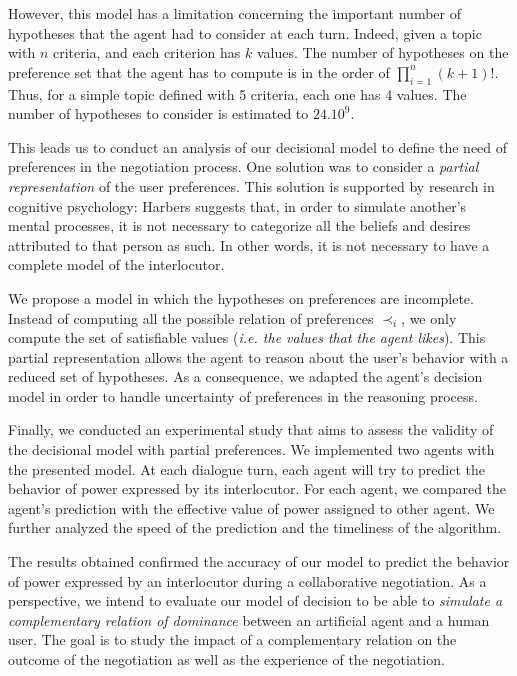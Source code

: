 \documentclass[sigconf]{aamas}  %
\begin{document}
		However, this model has a limitation concerning the important number of hypotheses that the agent had to consider at each turn. Indeed, given a topic with $n$ criteria, and each criterion has $k$ values. The number of hypotheses on the preference set that the agent has to compute is in the order of  $\prod_{i=1}^n (k+1)!$. 
		Thus, for a simple topic defined with 5 criteria, each one has 4 values. The number of hypotheses to consider is estimated to $24.10^9$. 
		
		This leads us to conduct an analysis of our decisional model to define the need of preferences in the negotiation process. One solution was to consider a \textit{partial representation} of the user preferences. This solution is supported  by research in cognitive psychology: Harbers \cite{harbers2009modeling} suggests that, in order to simulate another's mental processes, it is not necessary to categorize all the beliefs and desires attributed to that person as such. In other words, it is not necessary to have a complete model of the interlocutor.
		
		We propose a model in which the hypotheses on preferences are incomplete. Instead of computing all the possible relation of preferences $\prec_i$, we only compute the set of satisfiable values (\emph{i.e. the values that the agent likes}). This partial representation allows the agent to reason about the user's behavior with a reduced set of hypotheses.
		As a consequence, we adapted the agent's decision model in order to handle uncertainty of preferences in the reasoning process. 
		
		Finally, we conducted an experimental study that aims to assess the validity of the decisional model with partial preferences. 
		We implemented two agents with the presented model. At each dialogue turn, each agent will try to predict the behavior of power expressed by its interlocutor.  For each agent, we compared the agent's prediction with the effective value of power assigned to other agent. 
		We further analyzed the speed of the prediction and the timeliness of the algorithm. 
		
		The results obtained confirmed the accuracy of our model to predict the behavior of power expressed by an interlocutor during a collaborative negotiation.  As a perspective, we intend to evaluate our model of decision to be able to \emph{simulate a complementary relation of dominance} between an artificial agent and a human user. The goal is to study the impact of a complementary relation on the outcome of the negotiation as well as the experience of the negotiation. 
		
		
		 
		
		
		
		
		


	
	
	
\end{document}
